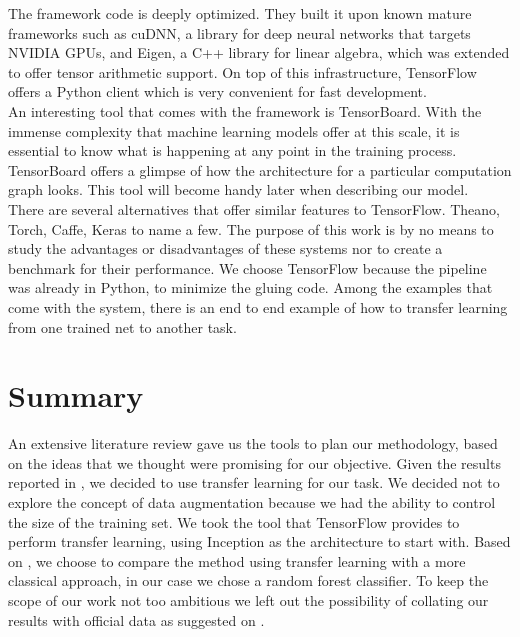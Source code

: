 The framework code is deeply optimized. They built it upon known mature frameworks such as cuDNN, a library for deep neural networks that targets NVIDIA GPUs, and Eigen, a C++ library for linear algebra, which was extended to offer tensor arithmetic support. On top of this infrastructure, TensorFlow offers a Python client which is very convenient for fast development.\\

An interesting tool that comes with the framework is TensorBoard. With the immense complexity that machine learning models offer at this scale, it is essential to know what is happening at any point in the training process. TensorBoard offers a glimpse of how the architecture for a particular computation graph looks. This tool will become handy later when describing our model.\\

There are several alternatives that offer similar features to TensorFlow. Theano, Torch, Caffe, Keras to name a few. The purpose of this work is by no means to study the advantages or disadvantages of these systems nor to create a benchmark for their performance. We choose TensorFlow because the pipeline was already in Python,  to minimize the gluing code. Among the examples that come with the system, there is an end to end example of how to transfer learning from one trained net to another task.\\

\section{Summary}

An extensive literature review gave us the tools to plan our methodology, based on the ideas that we thought were promising for our objective. Given the results reported in \cite{DBLP:journals/corr/YosinskiCBL14}, we decided to use transfer learning for our task. We decided not to explore the concept of data augmentation because we had the ability to control the size of the training set. We took the tool that TensorFlow provides to perform transfer learning, using Inception as the architecture to start with. Based on \cite{DBLP:journals/corr/RazavianASC14}, we choose to compare the method using transfer learning with a more classical approach, in our case we chose a random forest classifier. To keep the scope of our work not too ambitious we left out the possibility of collating our results with official data as suggested on \cite{Kryvasheyeue1500779}.








